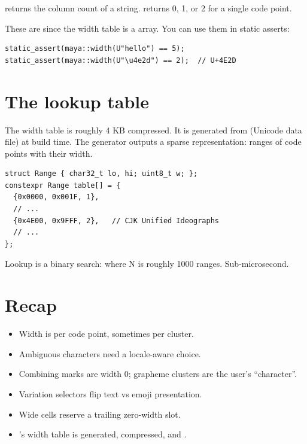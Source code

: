  returns the column count
of a string.  returns 0, 1, or 2 for
a single code point.

These are  since the width table is a
 array. You can use them in static asserts:

\begin{lstlisting}
static_assert(maya::width(U"hello") == 5);
static_assert(maya::width(U"\u4e2d") == 2);  // U+4E2D
\end{lstlisting}

\section{The lookup table}

The width table is roughly 4 KB compressed. It is generated from
 (Unicode data file) at build time. The
generator outputs a sparse representation: ranges of code points
with their width.

\begin{lstlisting}
struct Range { char32_t lo, hi; uint8_t w; };
constexpr Range table[] = {
  {0x0000, 0x001F, 1},
  // ...
  {0x4E00, 0x9FFF, 2},   // CJK Unified Ideographs
  // ...
};
\end{lstlisting}

Lookup is a binary search:  where N is roughly
1000 ranges. Sub-microsecond.

\section{Recap}

\begin{recap}
\begin{itemize}[leftmargin=*]
  \item Width is per code point, sometimes per cluster.
  \item Ambiguous characters need a locale-aware choice.
  \item Combining marks are width 0; grapheme clusters are the
    user's ``character''.
  \item Variation selectors flip text vs emoji presentation.
  \item Wide cells reserve a trailing zero-width slot.
  \item \maya{}'s width table is generated, compressed, and
    .
\end{itemize}
\end{recap}

